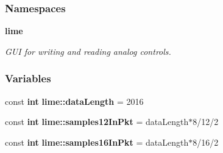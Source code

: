\subsubsection*{Namespaces}
\begin{DoxyCompactItemize}
\item 
 {\bf lime}
\begin{DoxyCompactList}\small\item\em G\+UI for writing and reading analog controls. \end{DoxyCompactList}\end{DoxyCompactItemize}
\subsubsection*{Variables}
\begin{DoxyCompactItemize}
\item 
const {\bf int} {\bf lime\+::data\+Length} = 2016
\item 
const {\bf int} {\bf lime\+::samples12\+In\+Pkt} = data\+Length$\ast$8/12/2
\item 
const {\bf int} {\bf lime\+::samples16\+In\+Pkt} = data\+Length$\ast$8/16/2
\end{DoxyCompactItemize}
